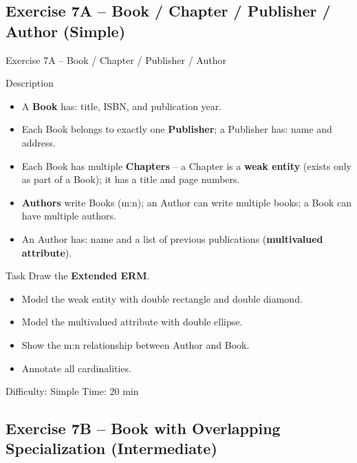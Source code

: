 \documentclass[10pt]{beamer}
\begin{document}
\subsection{Exercise 7A -- Book / Chapter / Publisher / Author (Simple)}

\begin{frame}{Exercise 7A -- Book / Chapter / Publisher / Author}
  \begin{block}{Description}
    \begin{itemize}
      \item A \textbf{Book} has: title, ISBN, and publication year.
      \item Each Book belongs to exactly one \textbf{Publisher}; a Publisher has: name and address.
      \item Each Book has multiple \textbf{Chapters} -- a Chapter is a \textbf{weak entity} (exists only as part of a Book); it has a title and page numbers.
      \item \textbf{Authors} write Books (m:n); an Author can write multiple books; a Book can have multiple authors.
      \item An Author has: name and a list of previous publications (\textbf{multivalued attribute}).
    \end{itemize}
  \end{block}

  \begin{block}{Task}
    Draw the \textbf{Extended ERM}.
    \begin{itemize}
      \item Model the weak entity with double rectangle and double diamond.
      \item Model the multivalued attribute with double ellipse.
      \item Show the m:n relationship between Author and Book.
      \item Annotate all cardinalities.
    \end{itemize}
  \end{block}

  \begin{alertblock}{Difficulty: Simple \quad Time: 20 min}
  \end{alertblock}
\end{frame}

\subsection{Exercise 7B -- Book with Overlapping Specialization (Intermediate)}
\end{document}
